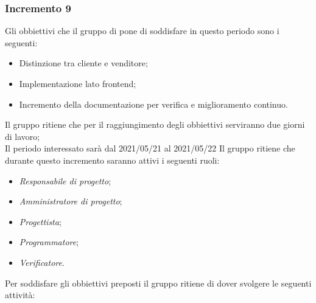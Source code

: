 \subsubsection{Incremento 9}
Gli obbiettivi che il gruppo di pone di soddisfare in questo periodo sono i seguenti:
\begin{itemize}
    \item Distinzione tra cliente e venditore;
    \item Implementazione lato frontend;
    \item Incremento della documentazione per verifica e miglioramento continuo.
\end{itemize}
Il gruppo ritiene che per il raggiungimento degli obbiettivi serviranno due giorni di lavoro;\\
Il periodo interessato sarà dal 2021/05/21 al 2021/05/22
Il gruppo ritiene che durante questo incremento saranno attivi i seguenti ruoli:
\begin{itemize}
    \item \textit{Responsabile di progetto};
    \item \textit{Amministratore di progetto};
    \item \textit{Progettista};
    \item \textit{Programmatore};
    \item \textit{Verificatore}.
\end{itemize}
Per soddisfare gli obbiettivi preposti il gruppo ritiene di dover svolgere le seguenti attività:

